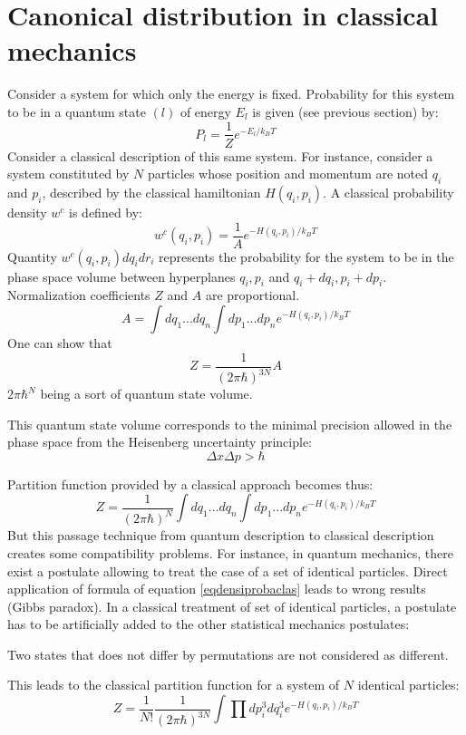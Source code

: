 \documentclass[12pt]{book}
\begin{document}
\section{Canonical distribution in classical mechanics}\label{secdistclassi} 
Consider a system for which only the energy is fixed. Probability for this
system to be in a quantum state $(l)$ of energy $E_l$ is given (see previous
section) by:
\begin{equation}
P_l=\frac{1}{Z}e^{-E_l/k_BT}
\end{equation}
Consider a classical description of this same system. For instance, consider a
system constituted by $N$ particles whose position and momentum are noted $q_i$
and $p_i$, described by the classical hamiltonian $H(q_i,p_i)$.
A classical probability density $w^c$ is defined by:
\begin{equation}\label{eqdensiprobaclas}
w^c(q_i,p_i)=\frac{1}{A}e^{-H(q_i,p_i)/k_BT}
\end{equation}
Quantity $w^c(q_i,p_i)dq_idr_i$ represents the probability for the system to
be in the phase space volume between hyperplanes  $q_i,p_i$ and $q_i+dq_i,
p_i+dp_i$. 
Normalization coefficients $Z$ and $A$ are proportional.
\begin{equation}
A=\int dq_1...dq_n\int dp_1...dp_n e^{-H(q_i,p_i)/k_BT}
\end{equation}
One can show \cite{ph:physt:Diu89} that
\begin{equation}
Z=\frac{1}{(2\pi\hbar)^{3N}}A
\end{equation}
$2\pi\hbar^N$ being a sort of quantum state volume.
\begin{rem}
This quantum state volume corresponds to the minimal precision allowed in the
phase space from the Heisenberg uncertainty principle:
\begin{equation}
\Delta x \Delta p > \hbar
\end{equation}
\end{rem}
Partition function provided by a classical approach becomes thus:
\begin{equation}
Z=\frac{1}{(2\pi\hbar)^N}\int dq_1...dq_n\int dp_1...dp_n e^{-H(q_i,p_i)/k_BT}
\end{equation}
But this passage technique from quantum description to classical description
creates some compatibility problems. For instance, in quantum mechanics, there
exist a postulate allowing to treat the case of a set of identical particles.
Direct application of formula of equation \ref{eqdensiprobaclas} leads to
wrong results (Gibbs paradox). In a classical treatment of set of identical
particles, a postulate has to be artificially added to the other statistical
mechanics postulates:
\begin{postulat}
Two states that does not differ by permutations are not considered as
different. 
\end{postulat}
This leads to the classical partition function for a system of $N$ identical
particles: 
\begin{equation}
Z=\frac{1}{N!}\frac{1}{(2\pi\hbar)^{3N}}\int\prod dp^{3}_i dq^{3}_i
e^{-H(q_i,p_i)/k_BT} 
\end{equation}
\end{document}
